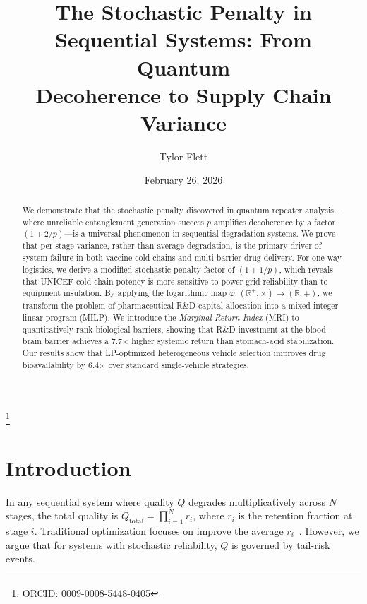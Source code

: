 \documentclass[aps,pra,reprint,amsmath,amssymb,superscriptaddress]{revtex4-2}
\begin{document}
\title{The Stochastic Penalty in Sequential Systems: From Quantum\\
Decoherence to Supply Chain Variance}

\author{Tylor Flett}
\thanks{ORCID: 0009-0008-5448-0405}

\date{February 26, 2026}

\begin{abstract}
We demonstrate that the stochastic penalty discovered in quantum repeater analysis---where unreliable entanglement generation success $p$ amplifies decoherence by a factor $(1 + 2/p)$---is a universal phenomenon in sequential degradation systems. We prove that per-stage variance, rather than average degradation, is the primary driver of system failure in both vaccine cold chains and multi-barrier drug delivery. For one-way logistics, we derive a modified stochastic penalty factor of $(1 + 1/p)$, which reveals that UNICEF cold chain potency is more sensitive to power grid reliability than to equipment insulation. By applying the logarithmic map $\varphi: (\mathbb{R}^+, \times) \to (\mathbb{R}, +)$, we transform the problem of pharmaceutical R\&D capital allocation into a mixed-integer linear program (MILP). We introduce the \emph{Marginal Return Index} (MRI) to quantitatively rank biological barriers, showing that R\&D investment at the blood-brain barrier achieves a 7.7$\times$ higher systemic return than stomach-acid stabilization. Our results show that LP-optimized heterogeneous vehicle selection improves drug bioavailability by 6.4$\times$ over standard single-vehicle strategies.
\end{abstract}

\maketitle


\section{Introduction}

In any sequential system where quality $Q$ degrades multiplicatively across $N$ stages, the total quality is $Q_{\text{total}} = \prod_{i=1}^{N} r_i$, where $r_i$ is the retention fraction at stage $i$. Traditional optimization focuses on improve the average $r_i$~\cite{boyd2004}. However, we argue that for systems with stochastic reliability, $Q$ is governed by tail-risk events.
\end{document}
